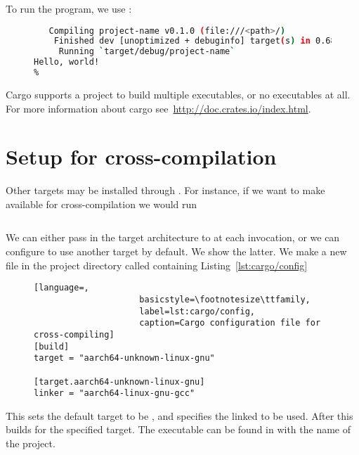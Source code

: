 \documentclass[a4paper,twoside]{report}
\begin{document}
\begin{appendices}
  To run the program, we use \cargo{}:
  \begin{figure}[ht]
  \begin{lstlisting}[language=Bash,numbers=none]
% cargo run
   Compiling project-name v0.1.0 (file:///<path>/)
    Finished dev [unoptimized + debuginfo] target(s) in 0.68 secs
     Running `target/debug/project-name`
Hello, world!
%
  \end{lstlisting}
\end{figure}

  Cargo supports a project to build multiple executables, or no executables at all.
  For more information about cargo see~\url{http://doc.crates.io/index.html}.


  \section*{Setup for cross-compilation}
  Other targets may be installed through \rustup{}. For instance, if we want to
  make  available for cross-compilation we would run
  \begin{lstlisting}[language=Bash,numbers=none]
% rustup target add aarch64-unknown-linux-gnu
  \end{lstlisting}
  We can either pass in the target architecture to \cargo{} at each invocation,
  or we can configure \cargo{} to use another target by default. We show the latter.
  We make a new file in the project directory called 
  containing Listing~\ref{lst:cargo/config}
  \begin{figure}[ht]
  \begin{lstlisting}[language=,
                     basicstyle=\footnotesize\ttfamily,
                     label=lst:cargo/config,
                     caption=Cargo configuration file for cross-compiling]
[build]
target = "aarch64-unknown-linux-gnu"

[target.aarch64-unknown-linux-gnu]
linker = "aarch64-linux-gnu-gcc"
  \end{lstlisting}
  \end{figure}
  This sets the default target to be ,
  and specifies the linked to be used.
  After this  builds for the specified target.
  The executable can be found in 
  with the name of the project.




\end{appendices}



\end{document}
